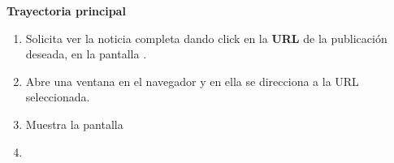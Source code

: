 


\begin{large}
	\textbf{Trayectoria principal}\\
\end{large}	

\begin{enumerate}[1.]
	\item \actor Solicita ver la noticia completa dando click en la \textbf{URL} de la publicación deseada, en la pantalla .
	\item \sistema Abre una ventana en el navegador y en ella se direcciona a la URL seleccionada. 
	\item \sistema Muestra la pantalla 
	\item \finCU	
\end{enumerate}







